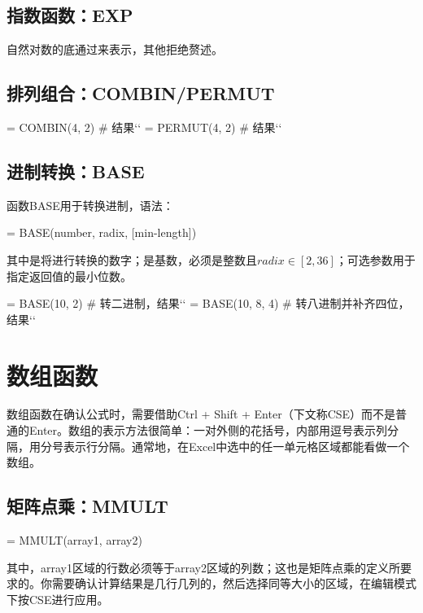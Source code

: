 \subsection{指数函数：EXP}
自然对数的底通过来表示，其他拒绝赘述。

\subsection{排列组合：COMBIN/PERMUT}
\begin{excode}
= COMBIN(4, 2)  # 结果``
= PERMUT(4, 2)  # 结果``
\end{excode}

\subsection{进制转换：BASE}
函数BASE用于转换进制，语法：
\begin{syntax}
= BASE(number, radix, [min-length])
\end{syntax}

其中是将进行转换的数字；是基数，必须是整数且$radix\in [2, 36]$；可选参数用于指定返回值的最小位数。

\begin{excode}
= BASE(10, 2)  # 转二进制，结果``
= BASE(10, 8, 4)  # 转八进制并补齐四位，结果``
\end{excode}

\section{数组函数}
数组函数在确认公式时，需要借助Ctrl + Shift + Enter（下文称CSE）而不是普通的Enter。数组的表示方法很简单：一对外侧的花括号，内部用逗号表示列分隔，用分号表示行分隔。通常地，在Excel中选中的任一单元格区域都能看做一个数组。

\subsection{矩阵点乘：MMULT}
\begin{syntax}
= MMULT(array1, array2)
\end{syntax}

其中，array1区域的行数必须等于array2区域的列数；这也是矩阵点乘的定义所要求的。你需要确认计算结果是几行几列的，然后选择同等大小的区域，在编辑模式下按CSE进行应用。

